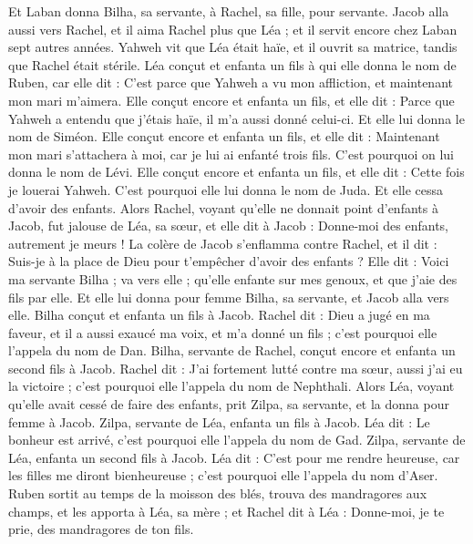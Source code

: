 \begin{multicols}{2}
Et Laban donna Bilha, sa servante, à Rachel, sa fille, pour servante.
Jacob alla aussi vers Rachel, et il aima Rachel plus que Léa ; et il servit encore chez Laban sept autres années.
Yahweh vit que Léa était haïe, et il ouvrit sa matrice, tandis que Rachel était stérile.
Léa conçut et enfanta un fils à qui elle donna le nom de Ruben, car elle dit : C'est parce que Yahweh a vu mon affliction, et maintenant mon mari m'aimera.
Elle conçut encore et enfanta un fils, et elle dit : Parce que Yahweh a entendu que j'étais haïe, il m'a aussi donné celui-ci. Et elle lui donna le nom de Siméon.
Elle conçut encore et enfanta un fils, et elle dit : Maintenant mon mari s'attachera à moi, car je lui ai enfanté trois fils. C'est pourquoi on lui donna le nom de Lévi.
Elle conçut encore et enfanta un fils, et elle dit : Cette fois je louerai Yahweh. C'est pourquoi elle lui donna le nom de Juda. Et elle cessa d'avoir des enfants.
\VerseOne{}Alors Rachel, voyant qu’elle ne donnait point d'enfants à Jacob, fut jalouse de Léa, sa sœur, et elle dit à Jacob : Donne-moi des enfants, autrement je meurs !
La colère de Jacob s’enflamma contre Rachel, et il dit : Suis-je à la place de Dieu pour t’empêcher d'avoir des enfants ?
Elle dit : Voici ma servante Bilha ; va vers elle ; qu’elle enfante sur mes genoux, et que j’aie des fils par elle.
Et elle lui donna pour femme Bilha, sa servante, et Jacob alla vers elle.
Bilha conçut et enfanta un fils à Jacob.
Rachel dit : Dieu a jugé en ma faveur, et il a aussi exaucé ma voix, et m'a donné un fils ; c'est pourquoi elle l’appela du nom de Dan.
Bilha, servante de Rachel, conçut encore et enfanta un second fils à Jacob.
Rachel dit : J'ai fortement lutté contre ma sœur, aussi j'ai eu la victoire ; c'est pourquoi elle l’appela du nom de Nephthali.
Alors Léa, voyant qu'elle avait cessé de faire des enfants, prit Zilpa, sa servante, et la donna pour femme à Jacob.
Zilpa, servante de Léa, enfanta un fils à Jacob.
Léa dit : Le bonheur est arrivé, c'est pourquoi elle l’appela du nom de Gad.
Zilpa, servante de Léa, enfanta un second fils à Jacob.
Léa dit : C'est pour me rendre heureuse, car les filles me diront bienheureuse ; c'est pourquoi elle l’appela du nom d’Aser.
Ruben sortit au temps de la moisson des blés, trouva des mandragores aux champs, et les apporta à Léa, sa mère ; et Rachel dit à Léa : Donne-moi, je te prie, des mandragores de ton fils.

\end{multicols}
